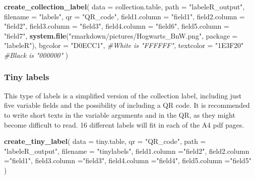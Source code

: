 \documentclass[10pt,a4paper,onecolumn]{article}
\newenvironment{Shaded}{\begin{snugshade}}{\end{snugshade}}
\newcommand{\AttributeTok}[1]{\textcolor[rgb]{0.13,0.29,0.53}{#1}}
\newcommand{\CommentTok}[1]{\textcolor[rgb]{0.56,0.35,0.01}{\textit{#1}}}
\newcommand{\FunctionTok}[1]{\textcolor[rgb]{0.13,0.29,0.53}{\textbf{#1}}}
\newcommand{\NormalTok}[1]{#1}
\newcommand{\StringTok}[1]{\textcolor[rgb]{0.31,0.60,0.02}{#1}}
\begin{document}
\begin{Shaded}
\begin{Highlighting}[]
\FunctionTok{create\_collection\_label}\NormalTok{(}
  \AttributeTok{data =}\NormalTok{ collection.table,}
  \AttributeTok{path =} \StringTok{"labeleR\_output"}\NormalTok{,}
  \AttributeTok{filename =} \StringTok{"labels"}\NormalTok{,}
  \AttributeTok{qr =} \StringTok{"QR\_code"}\NormalTok{,}
  \AttributeTok{field1.column =} \StringTok{"field1"}\NormalTok{,}
  \AttributeTok{field2.column =} \StringTok{"field2"}\NormalTok{,}
  \AttributeTok{field3.column =} \StringTok{"field3"}\NormalTok{,}
  \AttributeTok{field4.column =} \StringTok{"field6"}\NormalTok{,}
  \AttributeTok{field5.column =} \StringTok{"field7"}\NormalTok{,}
  \FunctionTok{system.file}\NormalTok{(}\StringTok{"rmarkdown/pictures/Hogwarts\_BnW.png"}\NormalTok{, }\AttributeTok{package =} \StringTok{"labeleR"}\NormalTok{),}
  \AttributeTok{bgcolor =} \StringTok{"D0ECC1"}\NormalTok{,  }\CommentTok{\#White is "FFFFFF",}
  \AttributeTok{textcolor =} \StringTok{"1E3F20"} \CommentTok{\#Black is "000000"}
\NormalTok{)}
\end{Highlighting}
\end{Shaded}

\subsubsection{Tiny labels}\label{tiny-labels}

This type of labels is a simplified version of the collection label,
including just five variable fields and the possibility of including a
QR code. It is recommended to write short texts in the variable
arguments and in the QR, as they might become difficult to read. 16
different labels will fit in each of the A4 pdf pages.

\begin{Shaded}
\begin{Highlighting}[]
\FunctionTok{create\_tiny\_label}\NormalTok{(}
  \AttributeTok{data =}\NormalTok{ tiny.table,}
  \AttributeTok{qr =} \StringTok{"QR\_code"}\NormalTok{,}
  \AttributeTok{path =} \StringTok{"labeleR\_output"}\NormalTok{,}
  \AttributeTok{filename =} \StringTok{"tinylabels"}\NormalTok{,}
  \AttributeTok{field1.column =}\StringTok{"field2"}\NormalTok{,}
  \AttributeTok{field2.column =}\StringTok{"field1"}\NormalTok{,}
  \AttributeTok{field3.column =}\StringTok{"field3"}\NormalTok{,}
  \AttributeTok{field4.column =}\StringTok{"field4"}\NormalTok{,}
  \AttributeTok{field5.column =}\StringTok{"field5"} 
\NormalTok{)}
\end{Highlighting}
\end{Shaded}
\end{document}
